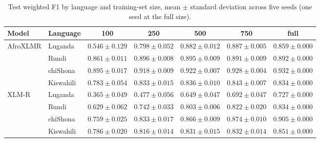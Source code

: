 \begin{table}[t]
\centering
\caption{Test weighted F1 by language and training-set size, mean $\pm$ standard deviation across five seeds (one seed at the full size).}
\label{tab:main_results}
\small
\begin{tabular}{llccccc}
\toprule
Model & Language & 100 & 250 & 500 & 750 & full \\
\midrule
AfroXLMR & Luganda & $0.546 \pm 0.129$ & $0.798 \pm 0.052$ & $0.882 \pm 0.012$ & $0.887 \pm 0.005$ & $0.859 \pm 0.000$ \\
 & Rundi & $0.861 \pm 0.011$ & $0.896 \pm 0.008$ & $0.895 \pm 0.009$ & $0.891 \pm 0.009$ & $0.892 \pm 0.000$ \\
 & chiShona & $0.895 \pm 0.017$ & $0.918 \pm 0.009$ & $0.922 \pm 0.007$ & $0.928 \pm 0.004$ & $0.932 \pm 0.000$ \\
 & Kiswahili & $0.783 \pm 0.054$ & $0.833 \pm 0.015$ & $0.836 \pm 0.010$ & $0.843 \pm 0.007$ & $0.834 \pm 0.000$ \\
\midrule
XLM-R & Luganda & $0.365 \pm 0.049$ & $0.477 \pm 0.056$ & $0.649 \pm 0.047$ & $0.692 \pm 0.047$ & $0.727 \pm 0.000$ \\
 & Rundi & $0.629 \pm 0.062$ & $0.742 \pm 0.033$ & $0.803 \pm 0.006$ & $0.822 \pm 0.020$ & $0.834 \pm 0.000$ \\
 & chiShona & $0.759 \pm 0.025$ & $0.833 \pm 0.017$ & $0.866 \pm 0.009$ & $0.874 \pm 0.010$ & $0.905 \pm 0.000$ \\
 & Kiswahili & $0.786 \pm 0.020$ & $0.816 \pm 0.014$ & $0.831 \pm 0.015$ & $0.832 \pm 0.014$ & $0.851 \pm 0.000$ \\
\bottomrule
\end{tabular}
\end{table}